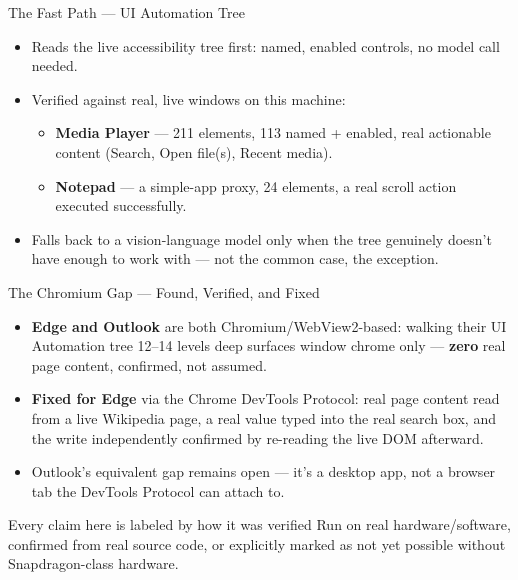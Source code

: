 \documentclass[12pt]{beamer}
\begin{document}
\begin{frame}{The Fast Path --- UI Automation Tree}

\begin{itemize}
  \item Reads the live accessibility tree first: named, enabled controls,
    no model call needed.
  \item Verified against real, live windows on this machine:
  \begin{itemize}
    \item \textbf{Media Player} --- 211 elements, 113 named + enabled,
      real actionable content (Search, Open file(s), Recent media).
    \item \textbf{Notepad} --- a simple-app proxy, 24 elements, a real
      scroll action executed successfully.
  \end{itemize}
  \item Falls back to a vision-language model only when the tree
    genuinely doesn't have enough to work with --- not the common case,
    the exception.
\end{itemize}

\end{frame}

\begin{frame}{The Chromium Gap --- Found, Verified, and Fixed}

\begin{itemize}
  \item \textbf{Edge and Outlook} are both Chromium/WebView2-based:
    walking their UI Automation tree 12--14 levels deep surfaces window
    chrome only --- \textbf{zero} real page content, confirmed, not
    assumed.
  \item \textbf{Fixed for Edge} via the Chrome DevTools Protocol: real
    page content read from a live Wikipedia page, a real value typed
    into the real search box, and the write independently confirmed by
    re-reading the live DOM afterward.
  \item Outlook's equivalent gap remains open --- it's a desktop app, not
    a browser tab the DevTools Protocol can attach to.
\end{itemize}

\vskip 0.2cm
{\small
\begin{block}{Every claim here is labeled by how it was verified}
Run on real hardware/software, confirmed from real source code, or
explicitly marked as not yet possible without Snapdragon-class hardware.
\end{block}
}

\end{frame}
\end{document}
